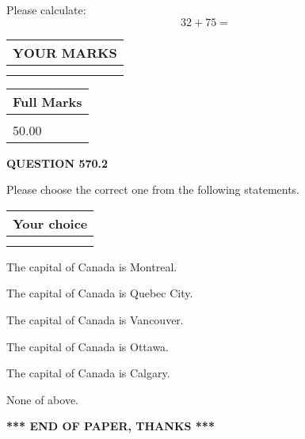 \documentclass[12pt]{article}
\begin{document}
  
 
Please calculate:
\begin{equation}
32 +  %
75 = \nonumber
\end{equation}
 

 

 
  
\vspace{0.2in}
  
\noindent\begin{tabular}{|l|}
\hline
 YOUR MARKS  \\
\hline
 \\ 
 \\ 
\hline
\end{tabular}
\hspace{0.05in} \begin{tabular}{|l|}
\hline
 Full Marks  \\
\hline
 \\ 
50.00 \\
\hline
\end{tabular}
{\textbf{\Large{QUESTION
570.2 
}}}
  
  
Please choose the correct one from the following statements.
  
  
\noindent\hspace{3.0in} \begin{tabular}{|l|}
\hline
Your choice \\
\hline
 \\ 
 \\ 
\hline
\end{tabular}
  
  
 
 
The capital of Canada is Montreal.
 
 
The capital of Canada is Quebec City.
 
 
The capital of Canada is Vancouver.
 
 
The capital of Canada is Ottawa.
 
 
The capital of Canada is Calgary.
 
 
 None of above.
 
 
   
   
 \vspace{0.2in}
 
   
   
   
   
\vspace{1.0in} 
{\textbf{\large{ *** END OF PAPER, THANKS *** }}} 
   
\end{document}
